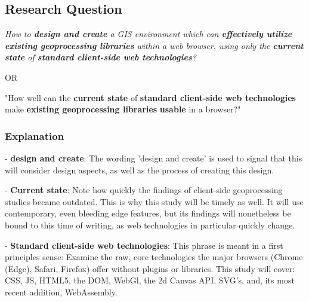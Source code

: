 

\subsection{Research Question}

\textit{How to \textbf{design and create} a GIS environment which can \textbf{effectively utilize} \textbf{existing geoprocessing libraries} within a web browser, using only the \textbf{current state} of \textbf{standard client-side web technologies}?}

OR

"How well can the \textbf{current state} of \textbf{standard client-side web technologies} make \textbf{existing geoprocessing libraries} \textbf{usable} in a browser?"

\subsubsection*{Explanation}


- \textbf{design and create}: The wording 'design and create' is used to signal that this will consider design aspects, as well as the process of creating this design. 

- \textbf{Current state}: Note how quickly the findings of client-side geoprocessing studies became outdated. This is why this study will be timely as well. It will use contemporary, even bleeding edge features, but its findings will nonetheless be bound to this time of writing, as web technologies in particular quickly change. 

- \textbf{Standard client-side web technologies}: This phrase is meant in a first principles sense: Examine the raw, core technologies the major browsers (Chrome (Edge), Safari, Firefox) offer without plugins or libraries. This study will cover: CSS, JS, HTML5, the DOM, WebGl, the 2d Canvas API, SVG's, and, its most recent addition, WebAssembly. 

